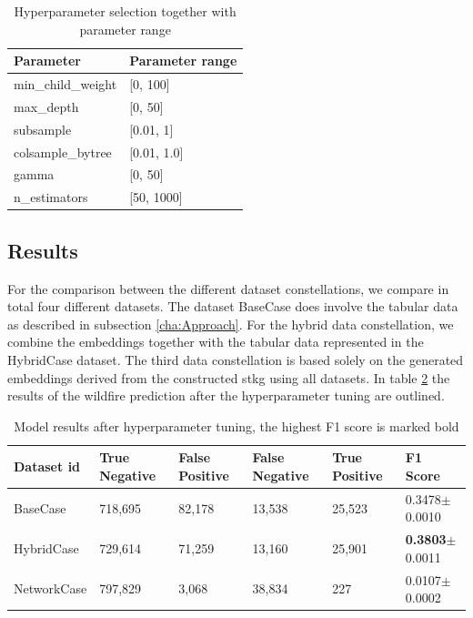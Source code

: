 \documentclass[
]{ceurart}
\begin{document}
\begin{table}[ht]
	\caption{Hyperparameter selection together with parameter range}
	\label{tab:parameterSetting}
	\begin{tabular}{p{}p{}}
		\toprule
		Parameter          & Parameter range \\
		\midrule
		min\_child\_weight & [0, 100]        \\
		max\_depth         & [0, 50]         \\
		subsample          & [0.01, 1]       \\
		colsample\_bytree  & [0.01, 1.0]     \\
		gamma              & [0, 50]         \\
		n\_estimators      & [50, 1000]      \\
		\bottomrule
	\end{tabular}
\end{table}

\subsection{Results}\label{cha:Results}
For the comparison between the different dataset constellations, we compare in total four different datasets. The dataset BaseCase does involve the tabular data as described in subsection \ref{cha:Approach}. For the hybrid data constellation, we combine the embeddings together with the tabular data represented in the HybridCase dataset. The third data constellation is based solely on the generated embeddings derived from the constructed \gls*{stkg} using all datasets. In table \ref{tab:resultModeling} the results of the wildfire prediction after the hyperparameter tuning are outlined.
\begin{table}[ht]
	\caption{Model results after hyperparameter tuning, the highest F1 score is marked bold}
	\label{tab:resultModeling}
	\begin{tabular}{p{}p{}p{}p{}p{}p{}}
		\toprule
		Dataset \gls*{id} & True Negative & False Positive & False Negative & True \linebreak Positive & F1 Score                   \\
		\midrule
		BaseCase          & 718,695       & 82,178         & 13,538         & 25,523                   & 0.3478$\pm$0.0010          \\
		HybridCase        & 729,614       & 71,259         & 13,160         & 25,901                   & \textbf{0.3803}$\pm$0.0011 \\
		NetworkCase       & 797,829       & 3,068          & 38,834         & 227                      & 0.0107$\pm$0.0002          \\
		\bottomrule
	\end{tabular}
\end{table}
\end{document}
